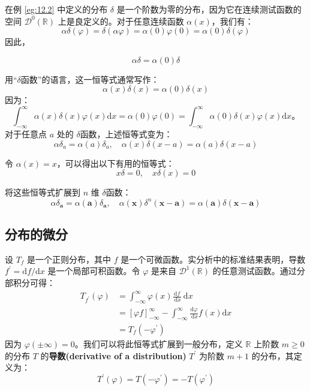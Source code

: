 \begin{eg}\label{eg:12.3}
在例 \ref{eg:12.2} 中定义的分布 $\delta$
是一个阶数为零的分布，因为它在连续测试函数的空间
$\mathcal{D}^0(\mathbb{R})$ 上是良定义的。对于任意连续函数
$\alpha(x)$，我们有：
 $$
\alpha \delta(\varphi) = \delta(\alpha \varphi) = \alpha(0) \varphi(0) = \alpha(0) \delta(\varphi)
$$
因此，

\begin{equation}
  \alpha \delta = \alpha(0) \delta
\end{equation}

用``$\delta$函数''的语言，这一恒等式通常写作：
 $$
\alpha(x) \delta(x) = \alpha(0) \delta(x)
$$
因为：
 $$
\int_{-\infty}^\infty \alpha(x) \delta(x) \varphi(x) \mathrm{d}x = \alpha(0) \varphi(0) = \int_{-\infty}^\infty \alpha(0) \delta(x) \varphi(x) \mathrm{d}x。
$$
对于任意点 $a$ 处的 $\delta$函数，上述恒等式变为：
\begin{equation}
  \alpha \delta_a = \alpha(a) \delta_a, \quad \alpha(x) \delta(x-a) = \alpha(a) \delta(x-a)
\end{equation}


令 $\alpha(x) = x$，可以得出以下有用的恒等式：
\begin{equation}
  x \delta = 0, \quad x \delta(x) = 0
\end{equation}

\end{eg}
\begin{exercise}
  将这些恒等式扩展到 $n$ 维 $\delta$函数：
 $$
\alpha \delta_{\mathbf{a}} = \alpha(\mathbf{a}) \delta_{\mathbf{a}}, \quad \alpha(\mathbf{x}) \delta^n(\mathbf{x} - \mathbf{a}) = \alpha(\mathbf{a}) \delta(\mathbf{x} - \mathbf{a})
$$
\end{exercise}

\subsection{分布的微分}

设 $T_f$ 是一个正则分布，其中 $f$
是一个可微函数。实分析中的标准结果表明，导数
$f^{\prime} = \mathrm{d}f / \mathrm{d}x$ 是一个局部可积函数。令
$\varphi$ 是来自 $\mathcal{D}^1(\mathbb{R})$
的任意测试函数。通过分部积分可得：
 $$
\begin{aligned}
T_{f^{\prime}}(\varphi) & = \int_{-\infty}^\infty \varphi(x) \frac{\mathrm{d}f}{\mathrm{~d}x} \mathrm{~d}x \\
& = [\varphi f]_{-\infty}^\infty - \int_{-\infty}^\infty \frac{\mathrm{d}\varphi}{\mathrm{~d}x} f(x) \mathrm{d}x \\
& = T_f\left(-\varphi^{\prime}\right)
\end{aligned}
$$
因为 $\varphi(\pm \infty) = 0$。我们可以将此恒等式扩展到一般分布，定义
$\mathbb{R}$ 上阶数 $m \geq 0$ 的分布 $T$ 的\textbf{导数(derivative of a distribution)}
$T^{\prime}$ 为阶数 $m+1$ 的分布，其定义为：
\begin{equation}\label{eq:12.6}
  T^{\prime}(\varphi) = T\left(-\varphi^{\prime}\right) = -T\left(\varphi^{\prime}\right)
\end{equation}


